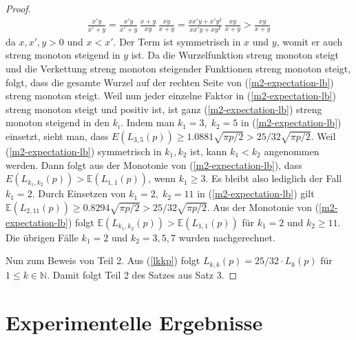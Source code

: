 \documentclass[a4paper, 11pt, ngerman]{article}
\newcommand{\E}{\mathbb{E}}
\newcommand{\N}{\mathbb{N}}
\begin{document}
\begin{proof}
    \begin{align*}
        \frac {x'y} {x' + y}
        = \frac {x'y} {x' + y} \, \frac {x + y} {xy} \, \frac {xy} {x + y}
        = \frac {xx'y + x'y^2} {xx'y + xy^2} \, \frac {xy} {x + y}
        > \frac {xy} {x + y}
    \end{align*}
    da $x, x', y > 0$ und $x < x'$. Der Term ist symmetrisch in $x$ und $y$, womit er auch streng monoton steigend in $y$ ist. Da die Wurzelfunktion streng monoton steigt und die Verkettung streng monoton steigender Funktionen streng monoton steigt, folgt, dass die gesamte Wurzel auf der rechten Seite von (\ref{m2-expectation-lb}) streng monoton steigt. Weil nun jeder einzelne Faktor in (\ref{m2-expectation-lb}) streng monoton steigt und positiv ist, ist ganz (\ref{m2-expectation-lb}) streng monoton steigend in den $k_i$. Indem man $k_1 = 3,\; k_2 = 5$ in (\ref{m2-expectation-lb}) einsetzt, sieht man, dass $E(L_{3, 5}(p)) \ge 1.0881 \sqrt{\pi p /2}  > 25 / 32 \sqrt{\pi p / 2}$. Weil (\ref{m2-expectation-lb}) symmetrisch in $k_1, k_2$ ist, kann $k_1 < k_2$ angenommen werden. Dann folgt aus der Monotonie von (\ref{m2-expectation-lb}), dass $E(L_{k_1, k_2}(p)) > \E(L_{1, 1}(p))$, wenn $k_1 \ge 3$. Es bleibt also lediglich der Fall $k_1 = 2$. Durch Einsetzen von $k_1 = 2, \; k_2 = 11$ in (\ref{m2-expectation-lb}) gilt $\E(L_{2, 11}(p)) \ge 0.8294 \sqrt{\pi p / 2} > 25 / 32 \sqrt{\pi p / 2}$. Aus der Monotonie von (\ref{m2-expectation-lb}) folgt $\E(L_{k_1, k_2}(p)) > \E(L_{1, 1}(p))$ für $k_1 = 2$ und $k_2 \ge 11$. Die übrigen Fälle $k_1 = 2$ und $k_2 = 3, 5, 7$ wurden nachgerechnet.

    Nun zum Beweis von Teil 2. Aus (\ref{lkkp}) folgt $L_{k, k}(p) = 25 / 32 \cdot L_{k}(p)$ für $1 \le k \in \N$. Damit folgt Teil 2 des Satzes aus Satz 3.
\end{proof}

\section{Experimentelle Ergebnisse}
\end{document}
